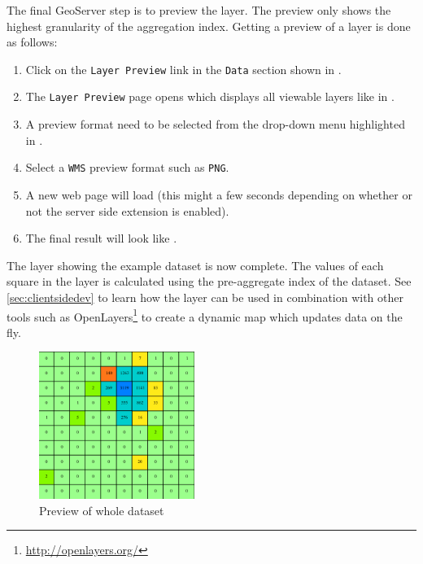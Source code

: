 The final GeoServer step is to preview the layer. The preview only shows
the highest granularity of the aggregation index. Getting a preview of a
layer is done as follows:
\begin{enumerate}[resume]
	\item Click on the \lstinline|Layer Preview| link in the
		\lstinline|Data| section shown in .
	\item The \lstinline|Layer Preview| page opens which displays all
		viewable layers like in .
	\item A preview format need to be selected from the drop-down menu
		highlighted in .
	\item Select a \lstinline|WMS| preview format such as \lstinline|PNG|.
	\item A new web page will load (this might a few seconds depending on
		whether or not the server side extension is enabled).
	\item The final result will look like .
\end{enumerate}

The layer showing the example dataset is now complete. The values of
each square in the layer is calculated using the pre-aggregate index of the
dataset. See \ref{sec:clientsidedev} to learn how the layer can be used in
combination with other tools such as
OpenLayers\footnote{\url{http://openlayers.org/}} to create a dynamic map
which updates data on the fly.

\begin{figure}[t]
\centering
\includegraphics[width=0.45\textwidth]{Figures/FinalResult.png}
\caption{Preview of whole dataset \label{fig:result}}
\end{figure}
